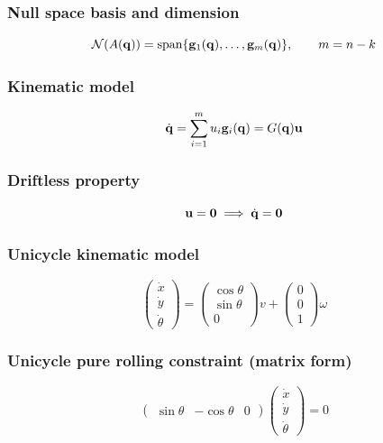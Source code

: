 \subsubsection{Null space basis and dimension}
\begin{equation*}
    \mathcal N(A({\mathbf q}))=\text{span}\{\mathbf g_1({\mathbf q}),\dots,\mathbf g_m({\mathbf q})\},\qquad m=n-k
\end{equation*}

\subsubsection{Kinematic model}
\begin{equation*}
    {\dot{\mathbf q}}=\sum_{i=1}^m u_i\mathbf g_i({\mathbf q})=G({\mathbf q})\mathbf u
\end{equation*}

\subsubsection{Driftless property}
\begin{equation*}
    \mathbf u=\mathbf 0\implies{\dot{\mathbf q}}=\mathbf 0
\end{equation*}

\subsubsection{Unicycle kinematic model}
\begin{equation*}
    \begin{pmatrix}\dot x\\\dot y\\\dot\theta\end{pmatrix}=\begin{pmatrix}\cos\theta\\\sin\theta\\0\end{pmatrix}v+\begin{pmatrix}0\\0\\1\end{pmatrix}\omega
\end{equation*}

\subsubsection{Unicycle pure rolling constraint (matrix form)}
\begin{equation*}
    \begin{pmatrix}\sin\theta&-\cos\theta&0\end{pmatrix}\begin{pmatrix}\dot x\\\dot y\\\dot\theta\end{pmatrix}=0
\end{equation*}

